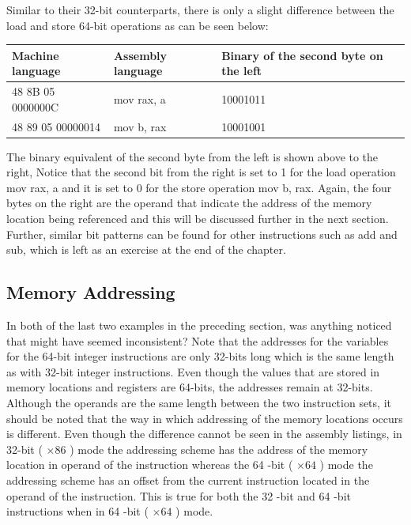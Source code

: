\documentclass[10pt]{book}
\begin{document}
Similar to their 32-bit counterparts, there is only a slight difference between the load and store 64-bit operations as can be seen below:

\begin{center}
\begin{tabular}{|l|l|l|}
\hline
Machine language & Assembly language & Binary of the second byte on the left \\
\hline
48 8B 05 0000000C & mov rax, a & 10001011 \\
\hline
48 89 05 00000014 & mov b, rax & 10001001 \\
\hline
\end{tabular}
\end{center}

The binary equivalent of the second byte from the left is shown above to the right, Notice that the second bit from the right is set to 1 for the load operation mov rax, a and it is set to 0 for the store operation mov b, rax. Again, the four bytes on the right are the operand that indicate the address of the memory location being referenced and this will be discussed further in the next section. Further, similar bit patterns can be found for other instructions such as add and sub, which is left as an exercise at the end of the chapter.

\subsection{Memory Addressing}
In both of the last two examples in the preceding section, was anything noticed that might have seemed inconsistent? Note that the addresses for the variables for the 64-bit integer instructions are only 32-bits long which is the same length as with 32-bit integer instructions. Even though the values that are stored in memory locations and registers are 64-bits, the addresses remain at 32-bits.
Although the operands are the same length between the two instruction sets, it should be noted that the way in which addressing of the memory locations occurs is different. Even though the difference cannot be seen in the assembly listings, in 32-bit ( $\times 86$ ) mode the addressing scheme has the address of the memory location in operand of the instruction whereas the 64 -bit ( $\times 64$ ) mode the addressing scheme has an offset from the current instruction located in the operand of the instruction. This is true for both the 32 -bit and 64 -bit instructions when in 64 -bit ( $\times 64$ ) mode.
\end{document}
